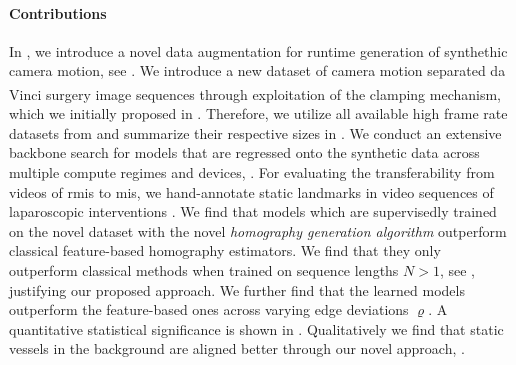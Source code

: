 \paragraph{Contributions} In , we introduce a novel data augmentation  for runtime generation of synthethic camera motion, see . We introduce a new dataset of camera motion separated da Vinci\textsuperscript{\textregistered} surgery image sequences through exploitation of the clamping mechanism, which we initially proposed in . Therefore, we utilize all available high frame rate datasets from  and summarize their respective sizes in . We conduct an extensive backbone search for models that are regressed onto the synthetic data across multiple compute regimes and devices, . For evaluating the transferability from videos of \acrshort{rmis} to \acrshort{mis}, we hand-annotate static landmarks in video sequences of laparoscopic interventions . We find that models which are supervisedly trained on the novel dataset with the novel \textit{homography generation algorithm} outperform classical feature-based homography estimators. We find that they only outperform classical methods when trained on sequence lengths $N>1$, see , justifying our proposed approach. We further find that the learned models outperform the feature-based ones across varying edge deviations $\varrho$. A quantitative statistical significance is shown in . Qualitatively we find that static vessels in the background are aligned better through our novel approach, .

